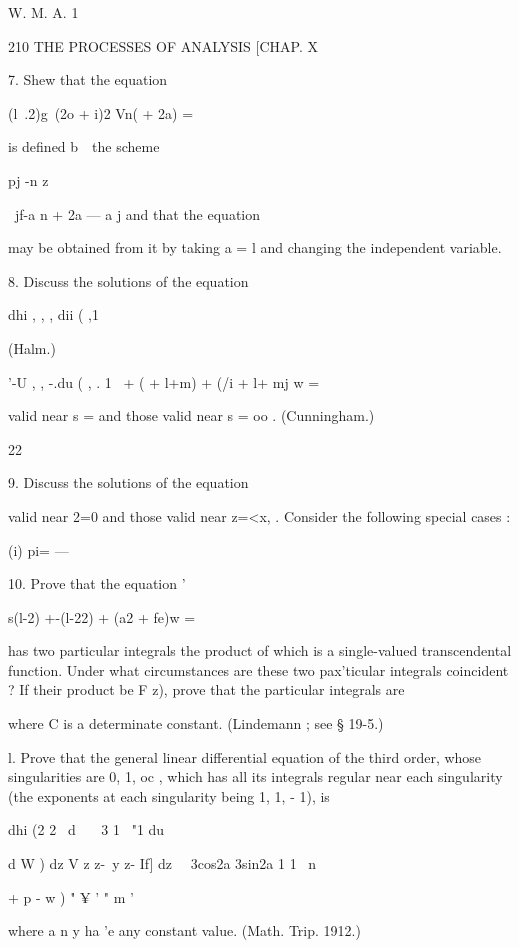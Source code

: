W. M. A. 1

210 THE PROCESSES OF ANALYSIS [CHAP. X

7. Shew that the equation

(l\ .2)g\ (2o + i)2 Vn( + 2a) =

is defined b\ \ the scheme

pj -n z

\ jf-a n + 2a — a j and that the equation

may be obtained from it by taking a = l and changing the independent
variable.

8. Discuss the solutions of the equation

dhi , , , dii ( ,1

(Halm.)

'-U , , -.du ( , . 1 \ + ( + l+m) + (/i + l+ mj w =

valid near s = and those valid near s = oo . (Cunningham.)

 22

9. Discuss the solutions of the equation

valid near 2=0 and those valid near z=<x, . Consider the following
special cases :

(i) pi= —%

10. Prove that the equation '

s(l-2) +-(l-22) + (a2 + fe)w =

has two particular integrals the product of which is a single-valued
transcendental function. Under what circumstances are these two
pax'ticular integrals coincident ? If their product be F z), prove
that the particular integrals are

where C is a determinate constant. (Lindemann ; see § 19-5.)

l. Prove that the general linear differential equation of the third
order, whose singularities are 0, 1, oc , which has all its integrals
regular near each singularity (the exponents at each singularity being
1, 1, - 1), is

dhi (2 2 \ d \ \ \ 3 1 \ "1 du

d W ) dz V z z-\ y z- If] dz \ \ 3cos2a 3sin2a 1 1 \ n

+ p - w ) " ¥ ' " m '

where a n y ha 'e any constant value. (Math. Trip. 1912.)

